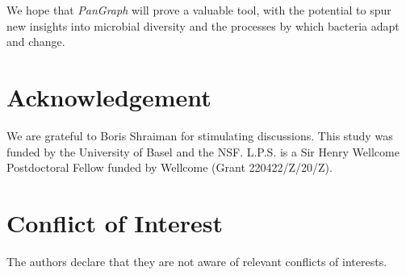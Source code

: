 \documentclass[aps,rmp,preprint,superscriptaddress,10pt,linenumbers]{revtex4-1}
\begin{document}
We hope that \textit{PanGraph} will prove a valuable tool, with the potential to spur new insights into microbial diversity and the processes by which bacteria adapt and change.


\section*{Acknowledgement}
We are grateful to Boris Shraiman for stimulating discussions.
This study was funded by the University of Basel and the NSF.
L.P.S. is a Sir Henry Wellcome Postdoctoral Fellow funded by Wellcome (Grant 220422/Z/20/Z).

\section*{Conflict of Interest}
The authors declare that they are not aware of relevant conflicts of interests.

{}
\end{document}
